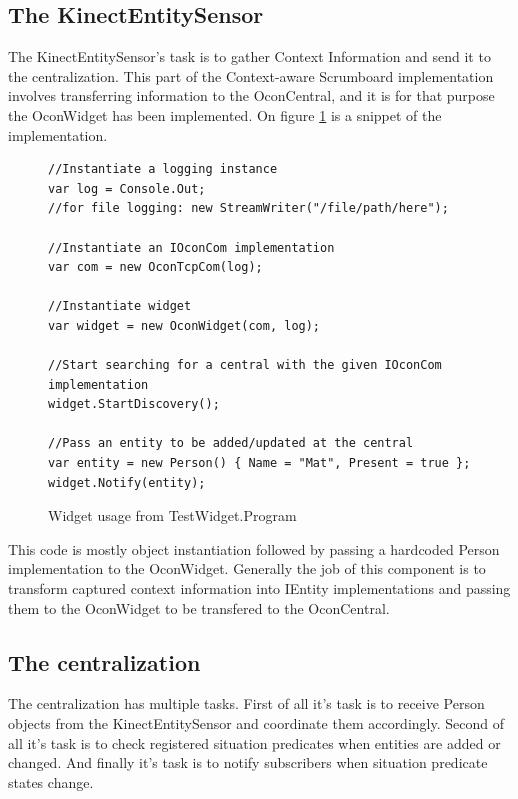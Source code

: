 \documentclass[../report.tex]{subfiles}
\begin{document}
\subsection{The KinectEntitySensor}
The KinectEntitySensor's task is to gather Context Information and send it to the centralization. This part of the Context-aware Scrumboard implementation involves transferring information to the OconCentral, and it is for that purpose the OconWidget has been implemented. On figure \ref{code:OconWidget} is a snippet of the implementation.
\begin{figure}[H]
\begin{lstlisting}
//Instantiate a logging instance
var log = Console.Out;
//for file logging: new StreamWriter("/file/path/here");

//Instantiate an IOconCom implementation
var com = new OconTcpCom(log);

//Instantiate widget
var widget = new OconWidget(com, log);

//Start searching for a central with the given IOconCom implementation
widget.StartDiscovery();

//Pass an entity to be added/updated at the central
var entity = new Person() { Name = "Mat", Present = true };
widget.Notify(entity);
\end{lstlisting}
\caption{Widget usage from TestWidget.Program}
\label{code:OconWidget}
\end{figure}

This code is mostly object instantiation followed by passing a hardcoded Person implementation to the OconWidget. Generally the job of this component is to transform captured context information into IEntity implementations and passing them to the OconWidget to be transfered to the OconCentral.



\newpage


\subsection{The centralization}


The centralization has multiple tasks. First of all it's task is to receive Person objects from the KinectEntitySensor and coordinate them accordingly. Second of all it's task is to check registered situation predicates when entities are added or changed. And finally it's task is to notify subscribers when situation predicate states change.
\end{document}
